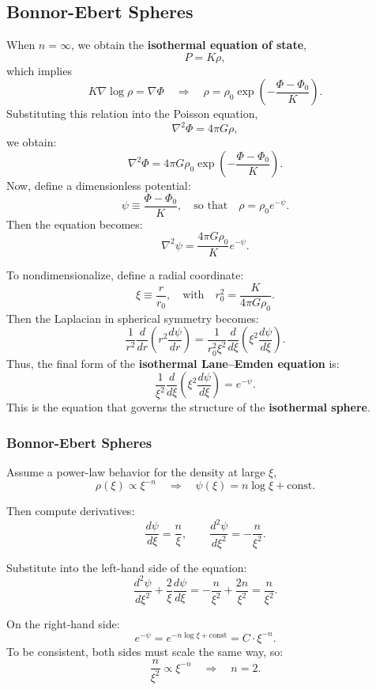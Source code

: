 \subsection{Bonnor-Ebert Spheres}

When \( n = \infty \), we obtain the \textbf{isothermal equation of state}, 
\[
P = K \rho,
\]
which implies
\[
K \nabla \log \rho = \nabla \Phi \quad \Rightarrow \quad \rho = \rho_0 \exp\left(-\frac{\Phi - \Phi_0}{K}\right).
\]
Substituting this relation into the Poisson equation,
\[
\nabla^2 \Phi = 4\pi G \rho,
\]
we obtain:
\[
\nabla^2 \Phi = 4\pi G \rho_0 \exp\left(-\frac{\Phi - \Phi_0}{K}\right).
\]
Now, define a dimensionless potential:
\[
\psi \equiv \frac{\Phi - \Phi_0}{K}, \quad \text{so that} \quad \rho = \rho_0 e^{-\psi}.
\]
Then the equation becomes:
\[
\nabla^2 \psi = \frac{4\pi G \rho_0}{K} e^{-\psi}.
\]

To nondimensionalize, define a radial coordinate:
\[
\xi \equiv \frac{r}{r_0}, \quad \text{with} \quad r_0^2 = \frac{K}{4\pi G \rho_0}.
\]
Then the Laplacian in spherical symmetry becomes:
\[
\frac{1}{r^2} \frac{d}{dr} \left( r^2 \frac{d\psi}{dr} \right)
= \frac{1}{r_0^2 \xi^2} \frac{d}{d\xi} \left( \xi^2 \frac{d\psi}{d\xi} \right).
\]
Thus, the final form of the \textbf{isothermal Lane–Emden equation} is:
\[
\boxed{
\frac{1}{\xi^2} \frac{d}{d\xi} \left( \xi^2 \frac{d\psi}{d\xi} \right) = e^{-\psi}.
}
\]
This is the equation that governs the structure of the \textbf{isothermal sphere}. 

\subsubsection{Bonnor-Ebert Spheres}

Assume a power-law behavior for the density at large \( \xi \),
\[
\rho(\xi) \propto \xi^{-n} \quad \Rightarrow \quad \psi(\xi) = n \log \xi + \text{const}.
\]

Then compute derivatives:
\[
\frac{d\psi}{d\xi} = \frac{n}{\xi}, \qquad \frac{d^2\psi}{d\xi^2} = -\frac{n}{\xi^2}.
\]

Substitute into the left-hand side of the equation:
\[
\frac{d^2\psi}{d\xi^2} + \frac{2}{\xi} \frac{d\psi}{d\xi} = -\frac{n}{\xi^2} + \frac{2n}{\xi^2} = \frac{n}{\xi^2}.
\]

On the right-hand side:
\[
e^{-\psi} = e^{-n \log \xi + \text{const}} = C \cdot \xi^{-n}.
\]
To be consistent, both sides must scale the same way, so:
\[
\frac{n}{\xi^2} \propto \xi^{-n} \quad \Rightarrow \quad n = 2.
\]

